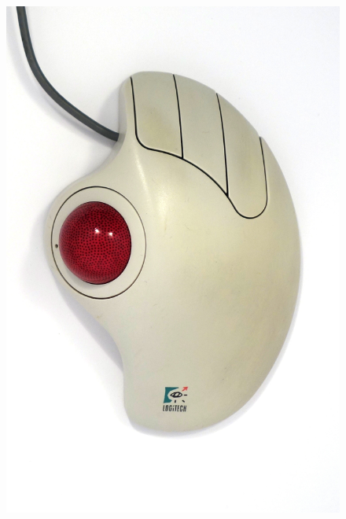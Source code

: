 \documentclass[11pt, a4paper]{article}
\begin{document}
\begin{figure}[h]
    \centering
    \includegraphics[scale=0.4]{1995_logitech_trackman/top_60.jpg}

\end{figure}
\end{document}
